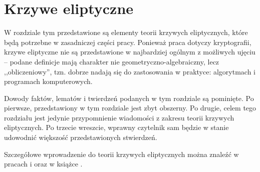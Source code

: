 \chapter{Krzywe eliptyczne}

\noindent
W rozdziale tym przedstawione są elementy teorii krzywych eliptycznych,
które będą potrzebne w zasadniczej części pracy.
Ponieważ praca dotyczy kryptografii,
krzywe eliptyczne nie są przedstawione
w najbardziej ogólnym z możliwych ujęciu --
podane definicje mają charakter nie geometryczno-algebraiczny,
lecz ,,obliczeniowy'',
tzn. dobrze nadają się do zastosowania w praktyce:
algorytmach i programach komputerowych.

\noindent
Dowody faktów, lematów i twierdzeń podanych w tym rozdziale są pominięte.
Po pierwsze, przedstawiony w tym rozdziale jest zbyt obszerny.
Po drugie, celem tego rozdziału jest jedynie przypomnienie wiadomości
z zakresu teorii krzywych eliptycznych.
Po trzecie wreszcie,
wprawny czytelnik sam będzie w stanie udowodnić
większość przedstawionych stwierdzeń.

\noindent
Szczegółowe wprowadzenie do teorii krzywych eliptycznych
można znaleźć w pracach \cite{ecintro1} i \cite{ecintro2}
oraz w książce \cite{silverman}.






